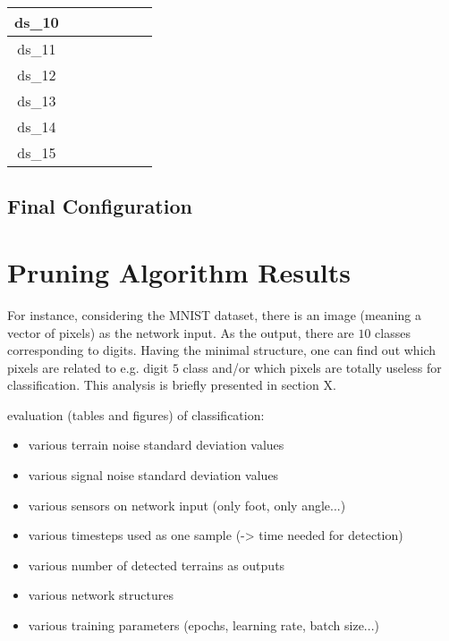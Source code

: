 \begin{table}[H]
\begin{tabular}{|c|c|c|c|c|c|c|}
ds\_10                            &                   &                    &                 &                   &                    &                 \\ \hline
ds\_11                            &                   &                    &                 &                   &                    &                 \\ \hline
ds\_12                            &                   &                    &                 &                   &                    &                 \\ \hline
ds\_13                            &                   &                    &                 &                   &                    &                 \\ \hline
ds\_14                            &                   &                    &                 &                   &                    &                 \\ \hline
ds\_15                            &                   &                    &                 &                   &                    &                 \\ \hline
\end{tabular}
\end{table}

\subsection{Final Configuration} \label{ssec:final_configuration}

\section{Pruning Algorithm Results} \label{sec:pruning_algorithm_results}

For instance, considering the MNIST dataset, there is an image (meaning a vector of pixels) as the network input. As the output, there are $ 10 $ classes corresponding to digits. Having the minimal structure, one can find out which pixels are related to e.g. digit $ 5 $ class and/or which pixels are totally useless for classification. This analysis is briefly presented in section X. 


evaluation (tables and figures) of classification:
\begin{itemize}
\item various terrain noise standard deviation values
\item various signal noise standard deviation values
\item various sensors on network input (only foot, only angle...)
\item various timesteps used as one sample (-> time needed for detection)
\item various number of detected terrains as outputs
\item various network structures
\item various training parameters (epochs, learning rate, batch size...)
\end{itemize}


